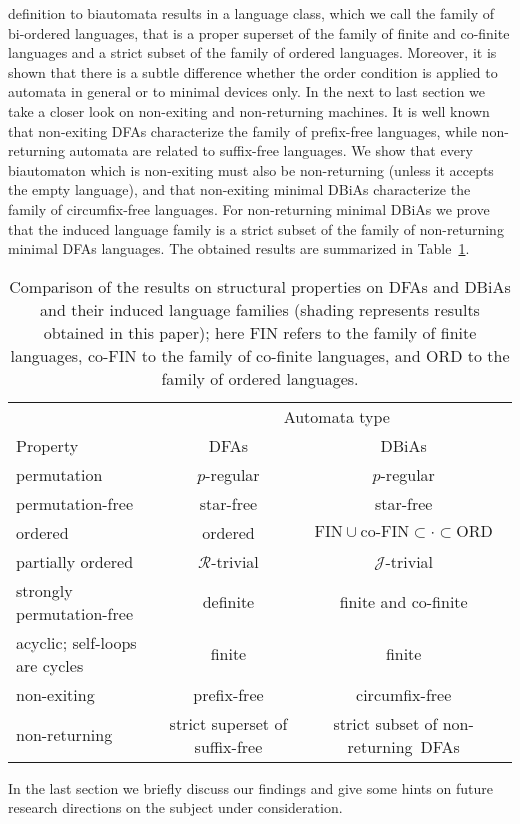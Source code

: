 \documentclass[submission]{eptcs}
\newcommand{\dfa}{\textrm{DFA}}
\newcommand{\dbia}{\textrm{DBiA}}
\begin{document}
definition to biautomata results in a language class, which we call
the family of bi-ordered languages, that is a proper superset of the
family of finite and co-finite languages and a strict subset of the
family of ordered languages. Moreover, it is shown that there is a
subtle difference whether the order condition is applied to automata
in general or to minimal devices only. In the next to last section we
take a closer look on non-exiting and non-returning machines. It is
well known that non-exiting \dfa s characterize the family of
prefix-free languages, while non-returning automata are related to
suffix-free languages. We show that every biautomaton which is
non-exiting must also be non-returning (unless it accepts the empty
language), and that non-exiting minimal \dbia s characterize the
family of circumfix-free languages. For non-returning minimal \dbia s
we prove that the induced language family is a strict subset of the
family of non-returning minimal \dfa s languages. The obtained results
are summarized in Table~\ref{tab:results}.
\def\shade{\cellcolor[gray]{0.75}}\begin{table}
  \centering
  \begin{tabular}{|l||c|c|}\hline\hline
 & \multicolumn{2}{c|}{Automata type}\\\cline{2-3}
Property & \dfa  s & \dbia s \\\hline\hline
permutation & $p$-regular & \shade $p$-regular\\\hline
permutation-free & star-free & \shade star-free\\\hline 
ordered & ordered & \shade $\mbox{FIN}\cup\mbox{co-FIN}\subset\cdot\subset\mbox{ORD}$ \\\hline
partially ordered & $\mathcal{R}$-trivial & $\mathcal{J}$-trivial\\\hline 
strongly permutation-free & \shade definite & \shade finite and co-finite\\\hline
acyclic; self-loops are cycles & finite & \shade finite\\\hline
non-exiting & prefix-free & \shade circumfix-free\\\hline
non-returning & strict superset of suffix-free & \shade strict subset of \mbox{non-returning \dfa s} \\\hline\hline
  \end{tabular}
  \caption{Comparison of the results on structural properties on \dfa s and \dbia s and their induced language families (shading represents results obtained in this paper); here $\mbox{FIN}$ refers to the family of finite languages, $\mbox{co-FIN}$ to the family of co-finite languages, and $\mbox{ORD}$ to the family of ordered languages.}
  \label{tab:results}
\end{table}
In the last section we briefly discuss our findings and give some
hints on future research directions on the subject under
consideration.
\end{document}
